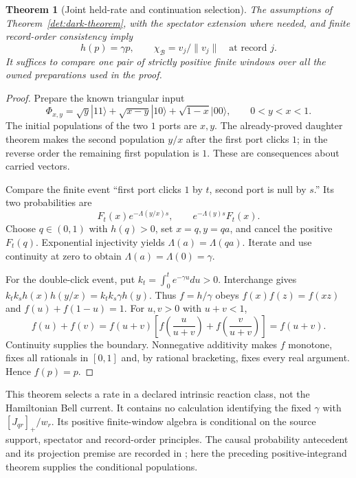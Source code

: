 \documentclass[11pt,oneside,openany]{book}
\newtheorem{theorem}{Theorem}[chapter]
\theoremstyle{definition}
\theoremstyle{remark}\newtheorem{remark}[theorem]{Remark}
\begin{document}
\begin{theorem}[Joint held-rate and continuation selection]
\label{det:joint-selection}
The assumptions of Theorem~\ref{det:dark-theorem}, with the spectator
extension where needed, and finite record-order consistency imply
\begin{equation}
 h(p)=\gamma p,\qquad
 \chi_{\mathcal B}=v_j/\|v_j\|\quad\text{at record }j.        \label{det:joint-law}
\end{equation}
It suffices to compare one pair of strictly positive finite windows
over all the owned preparations used in the proof.
\end{theorem}
\begin{proof}
Prepare the known triangular input
\[
 \Phi_{x,y}=\sqrt y|11\rangle+\sqrt{x-y}|10\rangle
                      +\sqrt{1-x}|00\rangle,
 \qquad 0<y<x<1.
\]
The initial populations of the two $1$ ports are $x,y$. The
already-proved daughter theorem makes the second population $y/x$
after the first port clicks $1$; in the reverse order the remaining
first population is $1$. These are consequences about carried vectors.

Compare the finite event ``first port clicks $1$ by $t$, second port
is null by $s$.'' Its two probabilities are
\begin{equation}
 F_t(x)e^{-\Lambda(y/x)s},\qquad
 e^{-\Lambda(y)s}F_t(x).                         \label{det:null-comparison}
\end{equation}
Choose $q\in(0,1)$ with $h(q)>0$, set $x=q,y=qa$, and cancel the
positive $F_t(q)$. Exponential injectivity yields
$\Lambda(a)=\Lambda(qa)$. Iterate and use continuity at zero to obtain
$\Lambda(a)=\Lambda(0)=\gamma$.

For the double-click event, put $k_t=\int_0^t e^{-\gamma u}du>0$.
Interchange gives $k_tk_s h(x)h(y/x)=k_tk_s\gamma h(y)$.
Thus $f=h/\gamma$ obeys $f(x)f(z)=f(xz)$ and
$f(u)+f(1-u)=1$. For $u,v>0$ with $u+v<1$,
\[
 f(u)+f(v)=f(u+v)
 \left[f\left(\frac{u}{u+v}\right)+
       f\left(\frac{v}{u+v}\right)\right]=f(u+v).
\]
Continuity supplies the boundary. Nonnegative additivity makes $f$
monotone, fixes all rationals in $[0,1]$ and, by rational bracketing,
fixes every real argument. Hence $f(p)=p$.
\end{proof}

This theorem selects a rate in a declared intrinsic reaction class,
not the Hamiltonian Bell current. It contains no calculation identifying
the fixed $\gamma$ with $[J_{qr}]_+/w_r$. Its positive finite-window
algebra is conditional on the source support, spectator and
record-order principles. The causal probability antecedent and its
projection premise are recorded in \cite{M15}; here the preceding
positive-integrand theorem supplies the conditional populations.
\end{document}
